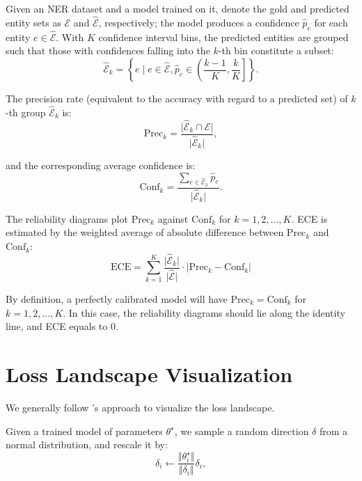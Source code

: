 \documentclass[11pt]{article}
\begin{document}
Given an NER dataset and a model trained on it, denote the gold and predicted entity sets as $\mathcal{E}$ and $\hat{\mathcal{E}}$, respectively; the model produces a confidence $\hat{p}_e$ for each entity $e \in \hat{\mathcal{E}}$. With $K$ confidence interval bins, the predicted entities are grouped such that those with confidences falling into the $k$-th bin constitute a subset:
\begin{equation*}
    \hat{\mathcal{E}}_k = \left\{ e \mid e \in \hat{\mathcal{E}}, \hat{p}_e \in \left( \frac{k-1}{K}, \frac{k}{K} \right] \right\}. 
\end{equation*}

The precision rate (equivalent to the accuracy with regard to a predicted set) of $k$-th group $\hat{\mathcal{E}}_k$ is: 
\begin{equation*}
    \mathrm{Prec}_k = \frac{\vert \hat{\mathcal{E}}_k \cap \mathcal{E} \vert}{\vert \hat{\mathcal{E}}_k \vert},
\end{equation*}

and the corresponding average confidence is: 
\begin{equation*}
    \mathrm{Conf}_k = \frac{\sum_{e \in \hat{\mathcal{E}}_k} \hat{p}_e}{\vert \hat{\mathcal{E}}_k \vert}. 
\end{equation*}

The reliability diagrams plot $\mathrm{Prec}_k$ against $\mathrm{Conf}_k$ for $k = 1,2,\dots,K$. ECE is estimated by the weighted average of absolute difference between $\mathrm{Prec}_k$ and $\mathrm{Conf}_k$: 
\begin{equation*}
    \mathrm{ECE} = \sum_{k=1}^{K} \frac{\vert \hat{\mathcal{E}}_k \vert}{\vert \hat{\mathcal{E}} \vert} \cdot \bigg\vert \mathrm{Prec}_k - \mathrm{Conf}_k \bigg\vert
\end{equation*}

By definition, a perfectly calibrated model will have $\mathrm{Prec}_k = \mathrm{Conf}_k$ for $k = 1,2,\dots,K$. In this case, the reliability diagrams should lie along the identity line, and ECE equals to 0. 

\section{Loss Landscape Visualization} \label{sec:landscape}
We generally follow \citet{li2018visualizing}'s approach to visualize the loss landscape. 

Given a trained model of parameters $\theta^\star$, we sample a random direction $\delta$ from a normal distribution, and rescale it by: 
\begin{equation*}
    \delta_i \leftarrow \frac{\Vert \theta^\star_i \Vert}{\Vert \delta_i \Vert} \delta_i, 
\end{equation*}
\end{document}
